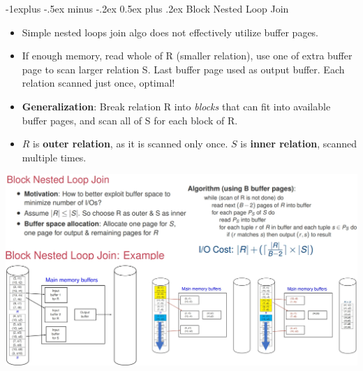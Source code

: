 \documentclass[10pt, landscape]{article}
\makeatletter
\renewcommand{\subsection}{\@startsection{subsection}{2}{0mm}%
                                {-1explus -.5ex minus -.2ex}%
                                {0.5ex plus .2ex}%
                                {\normalfont\normalsize\bfseries}}
\makeatother
\begin{document}
\begin{multicols*}{3}
\subsection{Block Nested Loop Join}
\begin{itemize}
\item Simple nested loops join algo does not effectively utilize buffer pages.
\item If enough memory, read whole of R (smaller relation), use one of extra buffer page to scan larger relation S. Last buffer page used as output buffer. Each relation scanned just once, optimal!
\item \textbf{Generalization}: Break relation R into \textit{blocks} that can fit into available buffer pages, and scan all of S for each block of R. 
\item $R$ is \textbf{outer relation}, as it is scanned only once. $S$ is \textbf{inner relation}, scanned multiple times.
\end{itemize}
\centerline{\includegraphics[width = 1\linewidth]{blockedNestedLoop}}


\end{multicols*}
\end{document}
